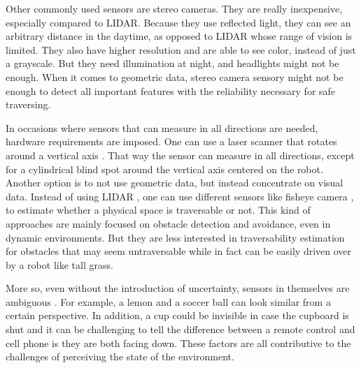\documentclass[12pt,a4paper,table,dvipsnames,tikz]{report}
\newcommand{\acronym}{\MakeUppercase}
\begin{document}
	Other commonly used sensors are stereo cameras. They are really inexpensive, 
	especially compared to \acronym{lidar}. Because they use reflected light, they 
	can see an arbitrary distance in the daytime, as opposed to \acronym{lidar} 
	whose range of vision is limited. They also have higher resolution and are able 
	to see color, instead of just a grayscale. But they need illumination at night, 
	and headlights might not be enough. When it comes to geometric data, stereo 
	camera sensory might not be enough to detect all important features with the 
	reliability necessary for safe traversing.
	\par
	In occasions where sensors that can measure in all directions are needed, 
	hardware requirements are imposed. One can use a laser scanner that rotates 
	around a vertical axis \citep{Droeschel}. That way the sensor can measure in 
	all directions, except for a cylindrical blind spot around the vertical axis 
	centered on the robot.
	\\
	
	Another option is to not use geometric data, but instead concentrate on visual 
	data. Instead of using \acronym{lidar} \citep{Suger, Lalonde}, one can use 
	different sensors like fisheye camera \citep{Hirose, HiroseGonet}, 
	to estimate whether a physical space is traversable or not. This kind of 
	approaches are mainly focused on obstacle detection and avoidance, even in 
	dynamic environments. But they are less interested in traversability 
	estimation for obstacles that may seem untraversable while in fact can be 
	easily driven over by a robot like tall grass.
	\par
	More so, even without the introduction of uncertainty, sensors in themselves are 
	ambiguous \citep{Shabbir}. For example, a lemon and a soccer ball can look 
	similar from a certain perspective. In addition, a cup could be invisible in case 
	the cupboard is shut and it can be challenging to tell the difference between a 
	remote control and cell phone is they are both facing down. These factors are all
	contributive to the challenges of perceiving the state of the environment.
	\\
	
\end{document}
